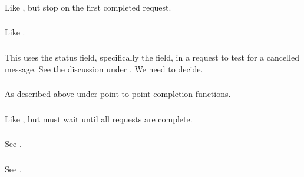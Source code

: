 \documentclass{article}
\begin{document}
\subsubsection{}
Like , but stop on the first completed request.



\subsubsection{}
Like .

\subsubsection{}
This uses the status field, specifically the
 field, in a request to test for a cancelled
message.  See the discussion under
.  We need to decide.

\subsubsection{}
As described above under point-to-point completion functions.

\subsubsection{}
Like , but must wait until all requests are complete.

\subsubsection{}
See .

\subsubsection{}
See .
\end{document}
